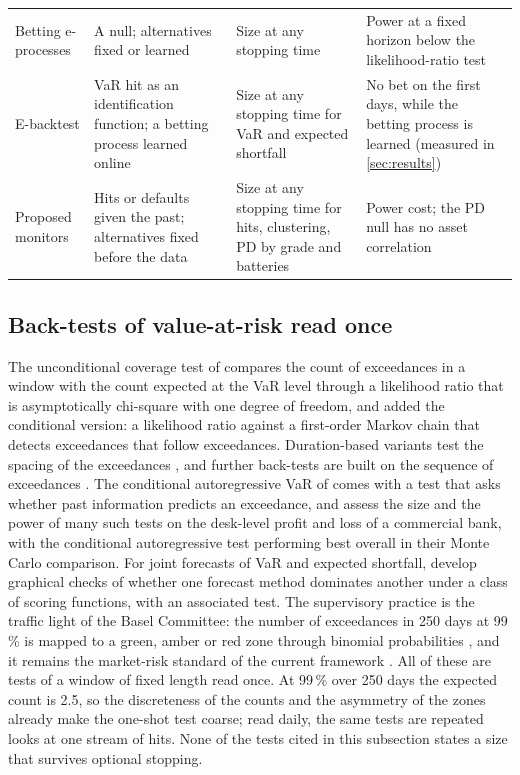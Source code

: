 \begin{table}[htbp]
\begin{tabularx}{\textwidth}{>{\raggedright\arraybackslash}p{3.3cm}>{\raggedright\arraybackslash}X>{\raggedright\arraybackslash}X>{\raggedright\arraybackslash}X}
Betting e-processes \citep{shafer2021,ramdas2023} & A null; alternatives fixed or learned & Size at any stopping time & Power at a fixed horizon below the likelihood-ratio test \\
E-backtest \citep{wang2022} & VaR hit as an identification function; a betting process learned online & Size at any stopping time for VaR and expected shortfall & No bet on the first days, while the betting process is learned (measured in \cref{sec:results}) \\
Proposed monitors & Hits or defaults given the past; alternatives fixed before the data & Size at any stopping time for hits, clustering, PD by grade and batteries & Power cost; the PD null has no asset correlation \\
\bottomrule
\end{tabularx}
\end{table}

\subsection{Back-tests of value-at-risk read once}
\label{sec:rw-var}

The unconditional coverage test of \citet{kupiec1995} compares the count of exceedances in a window with the count expected at the VaR level through a likelihood ratio
that is asymptotically chi-square with one degree of freedom, and \citet{christoffersen1998} added the conditional version: a likelihood ratio against a first-order Markov chain that detects
exceedances that follow exceedances. Duration-based variants test the spacing of the exceedances \citep{christoffersen2004,candelon2011}, and further back-tests are built on the sequence of exceedances
\citep{pelletier2015}. The conditional autoregressive VaR of \citet{engle2004} comes with a test that asks whether past information predicts an exceedance, and
\citet{berkowitz2011} assess the size and the power of many such tests on the desk-level profit and loss of a commercial bank, with the conditional autoregressive test performing best overall in
their Monte Carlo comparison. For joint forecasts of VaR and expected shortfall, \citet{ziegel2020} develop graphical checks of whether one forecast method dominates another under a class of scoring
functions, with an associated test. The supervisory practice is the traffic light of the Basel Committee: the number of exceedances in 250 days at 99\,\% is mapped to a green, amber or red zone through binomial
probabilities \citep{bcbs1996}, and it remains the market-risk standard of the current framework \citep{bcbs2019}. All of these are tests of a window of fixed length read once. At 99\,\% over 250 days the expected
count is 2.5, so the discreteness of the counts and the asymmetry of the zones already make the one-shot test coarse; read daily, the same tests are repeated looks at one stream of hits. None of the tests cited in this
subsection states a size that survives optional stopping.

